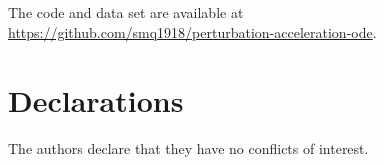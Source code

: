 \documentclass[11pt]{article}
\newcommand{\1}{\mathbf 1}
\numberwithin{equation}{section}
\begin{document}
The code and data set are available at \url{https://github.com/smq1918/perturbation-acceleration-ode}.

\section*{Declarations}

The authors declare that they have no conflicts of interest.



\end{document}
